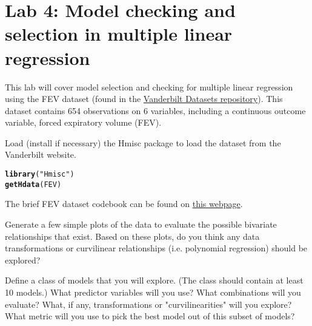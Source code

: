 \documentclass{article}\usepackage[]{graphicx}\usepackage[]{color}
\makeatletter
\newcommand{\hlstr}[1]{\textcolor[rgb]{0.192,0.494,0.8}{#1}}%
\newcommand{\hlstd}[1]{\textcolor[rgb]{0.345,0.345,0.345}{#1}}%
\newcommand{\hlkwd}[1]{\textcolor[rgb]{0.737,0.353,0.396}{\textbf{#1}}}%
\newenvironment{kframe}{%
 \def\at@end@of@kframe{}%
 \ifinner\ifhmode%
  \def\at@end@of@kframe{\end{minipage}}%
  \begin{minipage}{\columnwidth}%
 \fi\fi%
 \def\FrameCommand##1{\hskip\@totalleftmargin \hskip-\fboxsep
 \colorbox{shadecolor}{##1}\hskip-\fboxsep
     \hskip-\linewidth \hskip-\@totalleftmargin \hskip\columnwidth}%
 \MakeFramed {\advance\hsize-\width
   \@totalleftmargin\z@ \linewidth\hsize
   \@setminipage}}%
 {\par\unskip\endMakeFramed%
 \at@end@of@kframe}
\newenvironment{knitrout}{}{} %
\makeatother
\begin{document}

\section*{Lab 4: Model checking and selection in multiple linear regression}

This lab will cover model selection and checking for multiple linear regression using the FEV dataset (found in the \href{http://biostat.mc.vanderbilt.edu/wiki/Main/DataSets}{Vanderbilt Datasets repository}). This dataset contains 654 observations on 6 variables, including a continuous outcome variable, forced expiratory volume (FEV).

\begin{exercise}
Load (install if necessary) the Hmisc package to load the dataset from the Vanderbilt website.
\end{exercise}
\begin{knitrout}
\color{fgcolor}\begin{kframe}
\begin{alltt}
\hlkwd{library}\hlstd{(}\hlstr{"Hmisc"}\hlstd{)}
\hlkwd{getHdata}\hlstd{(FEV)}
\end{alltt}
\end{kframe}
\end{knitrout}

The brief FEV dataset codebook can be found on \href{http://biostat.mc.vanderbilt.edu/wiki/pub/Main/DataSets/FEV.html}{this webpage}. 

\begin{exercise}
Generate a few simple plots of the data to evaluate the possible bivariate relationships that exist. Based on these plots, do you think any data transformations or curvilinear relationships (i.e. polynomial regression) should be explored?
\end{exercise}

\begin{exercise}
 Define a class of models that you will explore. (The class should contain at least 10 models.)  What predictor variables will you use? What combinations will you evaluate? What, if any, transformations or "curvilinearities" will you explore? What metric will you use to pick the best model out of this subset of models?
\end{exercise}
\end{document}
